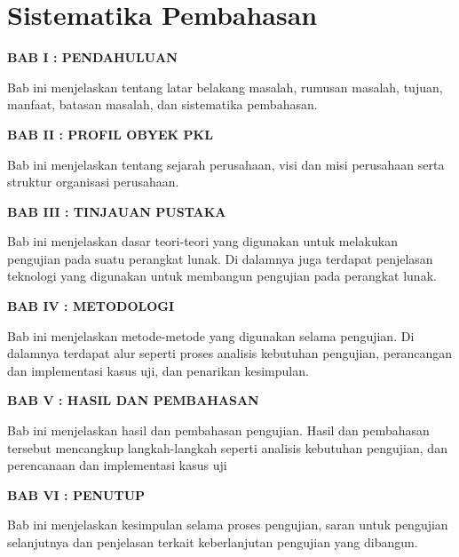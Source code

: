 \section{Sistematika Pembahasan}
\noindent
\textbf{BAB I : PENDAHULUAN}

Bab ini menjelaskan tentang latar belakang masalah, rumusan masalah,
tujuan, manfaat, batasan masalah, dan sistematika pembahasan.\par\null\par

\noindent
\textbf{BAB II : PROFIL OBYEK PKL}

Bab ini menjelaskan tentang sejarah perusahaan, visi dan misi
perusahaan serta struktur organisasi perusahaan. \par\null\par

\noindent
\textbf{BAB III : TINJAUAN PUSTAKA}

Bab ini menjelaskan dasar teori-teori yang digunakan untuk melakukan
pengujian pada suatu perangkat lunak. Di dalamnya juga terdapat
penjelasan teknologi yang digunakan untuk membangun
pengujian pada perangkat lunak. \par\null\par

\noindent
\textbf{BAB IV : METODOLOGI}

Bab ini menjelaskan metode-metode yang digunakan selama pengujian. Di
dalamnya terdapat alur seperti proses analisis kebutuhan pengujian,
perancangan dan implementasi kasus uji, dan penarikan kesimpulan.
\par\null\par

\noindent
\textbf{BAB V : HASIL DAN PEMBAHASAN}

Bab ini menjelaskan hasil dan pembahasan pengujian. Hasil dan
pembahasan tersebut mencangkup langkah-langkah seperti analisis
kebutuhan pengujian, dan perencanaan dan implementasi kasus uji \par\null\par

\newpage

\noindent
\textbf{BAB VI : PENUTUP}

Bab ini menjelaskan kesimpulan selama proses pengujian, saran untuk pengujian
selanjutnya dan penjelasan terkait keberlanjutan pengujian yang dibangun.


